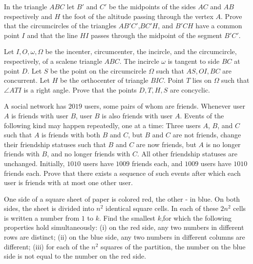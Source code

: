 \documentclass[11pt]{scrartcl}
\begin{document}
\begin{problem}[7243491713649826569]
In the triangle $ABC$ let $B'$ and $C'$ be the midpoints of the sides $AC$ and $AB$ respectively and $H$ the foot of the altitude passing through the vertex $A$. Prove that the circumcircles of the triangles $AB'C'$,$BC'H$, and $B'CH$ have a common point $I$ and that the line $HI$ passes through the midpoint of the segment $B'C'.$
\end{problem}
\begin{problem}[1168447466971762345]
	Let $I, O, \omega, \Omega$ be the incenter, circumcenter, the incircle, and the circumcircle, respectively, of a scalene triangle $ABC$. The incircle $\omega$ is tangent to side $BC$ at point $D$. Let $S$ be the point on the circumcircle $\Omega$ such that $AS, OI, BC$ are concurrent. Let $H$ be the orthocenter of triangle $BIC$. Point $T$ lies on $\Omega$ such that $\angle ATI$ is a right angle. Prove that the points $D, T, H, S$ are concyclic.
\end{problem}
\begin{problem}[8690567757444826166]
	A social network has $2019$ users, some pairs of whom are friends. Whenever user $A$ is friends with user $B$, user $B$ is also friends with user $A$. Events of the following kind may happen repeatedly, one at a time:
Three users $A$, $B$, and $C$ such that $A$ is friends with both $B$ and $C$, but $B$ and $C$ are not friends, change their friendship statuses such that $B$ and $C$ are now friends, but $A$ is no longer friends with $B$, and no longer friends with $C$. All other friendship statuses are unchanged.
Initially, $1010$ users have $1009$ friends each, and $1009$ users have $1010$ friends each. Prove that there exists a sequence of such events after which each user is friends with at most one other user.

\end{problem}
\begin{problem}[8317584744128058138]
	One side of a square sheet of paper is colored red, the other - in blue. On both sides, the sheet is divided into $n^2$ identical square cells. In each of these $2n^2$ cells is written a number from $1$ to $k$. Find the smallest $k$,for which the following properties hold simultaneously:
(i) on the red side, any two numbers in different rows are distinct;
(ii) on the blue side, any two numbers in different columns are different;
(iii) for each of the $n^2$ squares of the partition, the number on the blue side is not equal to the number on the red side.
\end{problem}
\end{document}
